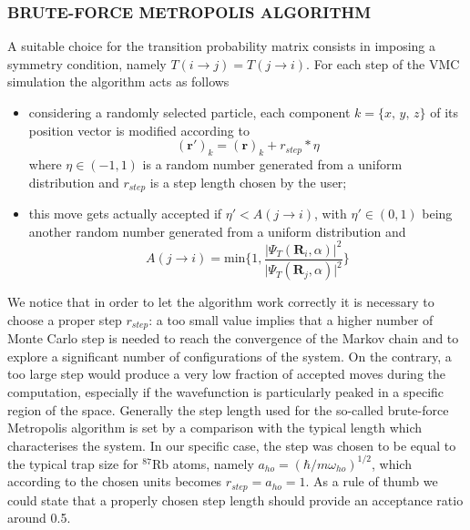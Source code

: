 \subsubsection{BRUTE-FORCE METROPOLIS ALGORITHM}
A suitable choice for the transition probability matrix consists in imposing a symmetry condition, namely $T( i\rightarrow j) = T(j \rightarrow i)$. For each step of the VMC simulation the algorithm acts as follows
\begin{itemize}
    \item considering a randomly selected particle, each  component $k = \{x,\,y,\,z\}$ of its position vector is modified according to
    \begin{equation*}
        (\bm{r}')_k = (\bm{r})_k + r_{step} \ast \eta
    \end{equation*}
    where $\eta \in (-1, 1)$ is a random number generated from a uniform distribution and $r_{step}$ is a step length chosen by the user;
    \item this move gets actually accepted if $\eta' < A(j\rightarrow i)$, with $\eta' \in (0,1)$ being another random number generated from a uniform distribution and
    \begin{equation}
        A(j \rightarrow i) = \text{min} \bigg\{ 1, \frac{\vert \Psi_T(\bm{R}_i, \alpha) \vert^2 }{\vert \Psi_T(\bm{R}_j, \alpha) \vert^2 } \bigg\}
        \label{acceptance_metropolis}
    \end{equation}
\end{itemize}
We notice that in order to let the algorithm work correctly it is necessary to choose a proper step $r_{step}$: a too small value implies that a higher number of Monte Carlo step is needed to reach the convergence of the Markov chain and to explore a significant number of configurations of the system. On the contrary, a too large step would produce a very low fraction of accepted moves during the computation, especially if the wavefunction is particularly peaked in a specific region of the space. Generally the step length used for the so-called brute-force Metropolis algorithm \cite{metropolis} is set by a comparison with the typical length which characterises the system. In our specific case, the step was chosen to be equal to the typical trap size for $^{87}$Rb atoms, namely $a_{ho}=(\hbar/m\omega_{ho})^{1/2}$, which according to the chosen units becomes $r_{step}=a_{ho}=1$. As a rule of thumb we could state that a properly chosen step length should provide an acceptance ratio around 0.5.




